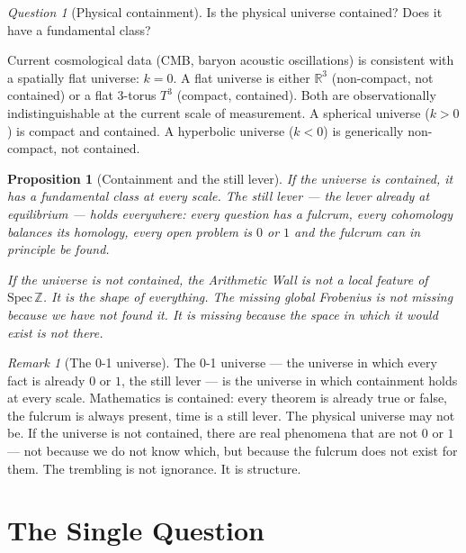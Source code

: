 \documentclass[12pt]{article}
\newtheorem{proposition}[theorem]{Proposition}
\theoremstyle{definition}
\theoremstyle{remark}
\newtheorem{remark}[theorem]{Remark}
\newtheorem{question}[theorem]{Question}
\begin{document}
\begin{question}[Physical containment]
\label{q:universe}
Is the physical universe contained?
Does it have a fundamental class?

Current cosmological data (CMB, baryon acoustic oscillations)
is consistent with a spatially flat universe: $k = 0$.
A flat universe is either $\mathbb{R}^3$ (non-compact, not contained)
or a flat 3-torus $T^3$ (compact, contained).
Both are observationally indistinguishable at the current scale
of measurement.
A spherical universe ($k > 0$) is compact and contained.
A hyperbolic universe ($k < 0$) is generically non-compact,
not contained.
\end{question}

\begin{proposition}[Containment and the still lever]
If the universe is contained, it has a fundamental class at every scale.
The still lever --- the lever already at equilibrium ---
holds everywhere: every question has a fulcrum,
every cohomology balances its homology,
every open problem is $0$ or $1$ and the fulcrum
can in principle be found.

If the universe is not contained, the Arithmetic Wall
is not a local feature of $\mathrm{Spec}\,\mathbb{Z}$.
It is the shape of everything.
The missing global Frobenius is not missing because
we have not found it. It is missing because the space
in which it would exist is not there.
\end{proposition}

\begin{remark}[The 0-1 universe]
The 0-1 universe --- the universe in which every fact is
already $0$ or $1$, the still lever --- is the universe
in which containment holds at every scale.
Mathematics is contained: every theorem is already true or false,
the fulcrum is always present, time is a still lever.
The physical universe may not be.
If the universe is not contained,
there are real phenomena that are not $0$ or $1$ ---
not because we do not know which,
but because the fulcrum does not exist for them.
The trembling is not ignorance. It is structure.
\end{remark}

\section{The Single Question}
\end{document}
